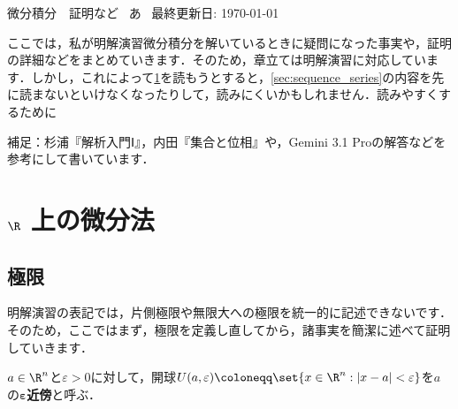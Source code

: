 \documentclass[a4paper,10pt]{ltjsarticle}
\begin{document}
\begin{center}
  {\LARGE 微分積分　証明など}\
  \vskip6.5pt
  {\large あ}\
  \vskip2pt
  {\large 最終更新日: \today}
\end{center}

ここでは，私が明解演習微分積分を解いているときに疑問になった事実や，証明の詳細などをまとめていきます．そのため，章立ては明解演習に対応しています．しかし，これによって\cref{sec:differentiation_R}を読もうとすると，\cref{sec:sequence_series}の内容を先に読まないといけなくなったりして，読みにくいかもしれません．読みやすくするために


補足：杉浦『解析入門Ⅰ』，内田『集合と位相』や，Gemini 3.1 Proの解答などを参考にして書いています．

\newpage
\tableofcontents
\newpage


\section{\texorpdfstring{\(\R\)}{R} 上の微分法}
\label{sec:differentiation_R}

\subsection{極限}
\label{sec:limit}

明解演習の表記では，片側極限や無限大への極限を統一的に記述できないです．そのため，ここではまず，極限を定義し直してから，諸事実を簡潔に述べて証明していきます．

\begin{MyDefinition}
  \(a \in \R^n\)と\(\varepsilon > 0\)に対して，開球\(U(a, \varepsilon)\coloneqq\set{x \in \R^n : |x - a| < \varepsilon}\)を\(a\)の\textbf{\(\bm \varepsilon\)近傍}と呼ぶ．
\end{MyDefinition}
\end{document}
